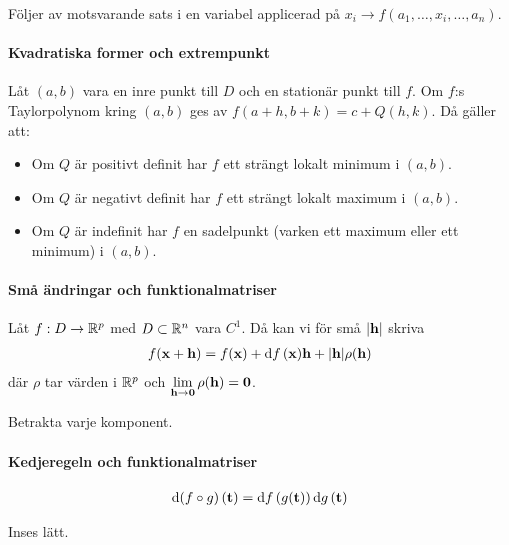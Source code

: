\proof
Följer av motsvarande sats i en variabel applicerad på $x_i\to f(a_1, \dots, x_i, \dots, a_n)$.

\paragraph{Kvadratiska former och extrempunkt}
Låt $(a, b)$ vara en inre punkt till $D$ och en stationär punkt till $f$. Om $f$:s Taylorpolynom kring $(a, b)$ ges av $f(a + h, b + k) = c + Q(h, k)$. Då gäller att:
\begin{itemize}
	\item Om $Q$ är positivt definit har $f$ ett strängt lokalt minimum i $(a, b)$.
	\item Om $Q$ är negativt definit har $f$ ett strängt lokalt maximum i $(a, b)$.
	\item Om $Q$ är indefinit har $f$ en sadelpunkt (varken ett maximum eller ett minimum) i $(a, b)$.
\end{itemize}

\paragraph{Små ändringar och funktionalmatriser}
Låt $f:D\to\mathbb{R}^p$ med $D\subset\mathbb{R}^n$ vara $C^1$. Då kan vi för små $\abs{\vect{h}}$ skriva
\begin{align*}
	f(\vect{x} + \vect{h}) = f(\vect{x}) + \dd{f} (\vect{x})\vect{h} + \abs{\vect{h}}\rho (\vect{h})
\end{align*}
där $\rho$ tar värden i $\mathbb{R}^p$ och $\limit{\vect{h}}{\vect{0}}\rho (\vect{h}) = \vect{0}$.

\proof
Betrakta varje komponent.

\paragraph{Kedjeregeln och funktionalmatriser}
\begin{align*}
	\dd{(f\circ g)} (\vect{t}) = \dd{f} (g(\vect{t}))\dd{g} (\vect{t})
\end{align*}

\proof
Inses lätt.